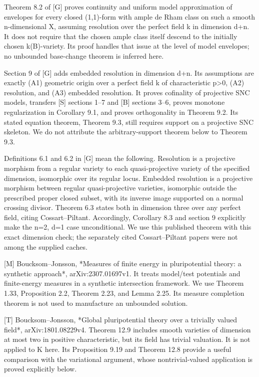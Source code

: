 \documentclass[11pt]{article}
\begin{document}
Theorem 8.2 of [G] proves continuity and uniform model approximation of envelopes for every closed (1,1)-form with ample de Rham class on such a smooth n-dimensional X, assuming resolution over the perfect field k in dimension d+n. It does not require that the chosen ample class itself descend to the initially chosen k(B)-variety. Its proof handles that issue at the level of model envelopes; no unbounded base-change theorem is inferred here.

Section 9 of [G] adds embedded resolution in dimension d+n. Its assumptions are exactly (A1) geometric origin over a perfect field k of characteristic p\textgreater{}0, (A2) resolution, and (A3) embedded resolution. It proves cofinality of projective SNC models, transfers [S] sections 1--7 and [B] sections 3--6, proves monotone regularization in Corollary 9.1, and proves orthogonality in Theorem 9.2. Its stated equation theorem, Theorem 9.3, still requires support on a projective SNC skeleton. We do not attribute the arbitrary-support theorem below to Theorem 9.3.

Definitions 6.1 and 6.2 in [G] mean the following. Resolution is a projective morphism from a regular variety to each quasi-projective variety of the specified dimension, isomorphic over its regular locus. Embedded resolution is a projective morphism between regular quasi-projective varieties, isomorphic outside the prescribed proper closed subset, with its inverse image supported on a normal crossing divisor. Theorem 6.3 states both in dimension three over any perfect field, citing Cossart--Piltant. Accordingly, Corollary 8.3 and section 9 explicitly make the n=2, d=1 case unconditional. We use this published theorem with this exact dimension check; the separately cited Cossart--Piltant papers were not among the supplied caches.

[M] Boucksom--Jonsson, *Measures of finite energy in pluripotential theory: a synthetic approach*, arXiv:2307.01697v1. It treats model/test potentials and finite-energy measures in a synthetic intersection framework. We use Theorem 1.33, Proposition 2.2, Theorem 2.23, and Lemma 2.25. Its measure completion theorem is not used to manufacture an unbounded solution.

[T] Boucksom--Jonsson, *Global pluripotential theory over a trivially valued field*, arXiv:1801.08229v4. Theorem 12.9 includes smooth varieties of dimension at most two in positive characteristic, but its field has trivial valuation. It is not applied to K here. Its Proposition 9.19 and Theorem 12.8 provide a useful comparison with the variational argument, whose nontrivial-valued application is proved explicitly below.
\end{document}
